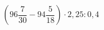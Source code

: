 \begin{ex}[type=calculate]
	\begin{condition}
		\( \left( 96\dfrac{7}{30}-94\dfrac{5}{18} \right)\cdot2,25:0,4 \)
	\end{condition}
	\answer{}
\end{ex}